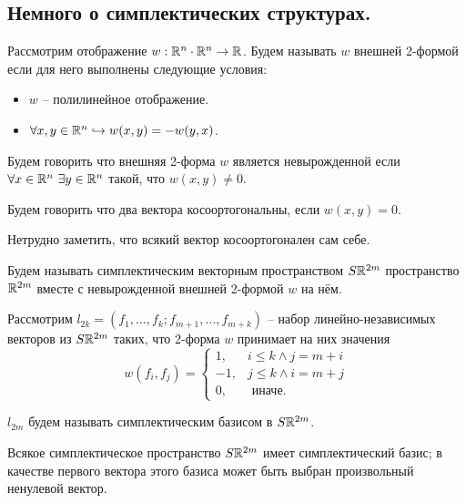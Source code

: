 \subsection{Немного о симплектических структурах.}
\begin{definition}
    Рассмотрим отображение $w: \mathbb{R}^n \cdot \mathbb{R}^n \to \mathbb{R}$.
    Будем называть $w$ внешней 2-формой если для него выполнены следующие условия:
    \begin{itemize}
        \item $w$ -- полилинейное отображение.
        \item $\forall x, y \in \mathbb{R}^n \hookrightarrow w(x, y) = -w(y, x)$.
    \end{itemize}
\end{definition}
\begin{definition}
    Будем говорить что внешняя 2-форма $w$ является невырожденной если $\forall x \in \mathbb{R}^n \  \exists y \in \mathbb{R}^n$ такой, что $w(x, y) \neq 0$.
\end{definition}
\begin{definition}
    Будем говорить что два вектора косоортогональны, если $w(x, y) = 0$.
\end{definition}
\begin{note}
    Нетрудно заметить, что всякий вектор косоортогонален сам себе.
\end{note}
\begin{definition}
    Будем называть симплектическим векторным пространством $S\mathbb{R}^{2m}$ пространство $\mathbb{R}^{2m}$ вместе с невырожденной внешней 2-формой $w$ на нём.
\end{definition}
Рассмотрим $l_{2k} = (f_1, \ldots, f_k; f_{m + 1}, \ldots, f_{m + k})$ -- набор линейно-независимых векторов из $S\mathbb{R}^{2m}$ таких, что 2-форма $w$ принимает на них значения
\[
    w(f_i, f_j) =
    \begin{cases}
        1, & i \leq k \wedge j = m + i \\
        -1, & j \leq k \wedge i = m + j \\
        0, & \text{ иначе}.
    \end{cases}
\]
\begin{definition}
    $l_{2m}$ будем называть симплектическим базисом в $S\mathbb{R}^{2m}$.
\end{definition}
\begin{theorem}[О корректности]
    Всякое симплектическое пространство $S\mathbb{R}^{2m}$ имеет симплектический базис; в качестве первого вектора этого базиса может быть выбран произвольный ненулевой вектор.
\end{theorem}
